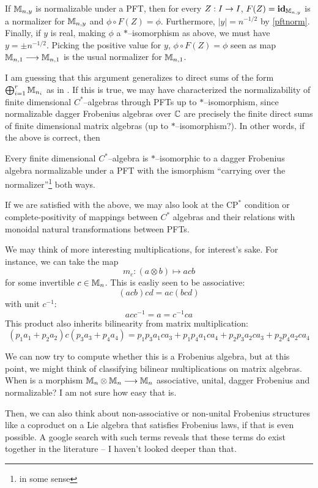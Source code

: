 If $\mathbb{M}_{n, y}$ is normalizable under a PFT, then for every $Z : I \rightarrow I$,
$F(Z) = \textbf{id}_{\mathbb{M}_{n, y}}$ is a normalizer for $\mathbb{M}_{n, y}$ and
$\phi \circ F(Z) = \phi$. Furthermore, $|y| = n^{-1/2}$ by \ref{pftnorm}.
Finally, if $y$ is real, making $\phi$ a $*$--isomorphism as above, we must have
$y = \pm n^{-1/2}$. Picking the positive value for $y$,
$\phi \circ F(Z) = \phi$ seen as map $\mathbb{M}_{n, 1} \longrightarrow \mathbb{M}_{n, 1}$ is the usual
normalizer for $\mathbb{M}_{n, 1}$.

I am guessing that this argument generalizes to direct sums of the form
$\bigoplus_{i = 1}^r \mathbb{M}_{n_i}$ as in \cite[10]{CatQChan}.  If this is true, we
may have characterized the normalizability of finite dimensional $C^*$--algebras
through PFTs up to $*$--isomorphism, since normalizable dagger Frobenius
algebras over $\mathbb{C}$ are precisely the finite direct sums of finite dimensional
matrix algebras (up to $*$--isomorphism?). In other words, if the above is
correct, then
\begin{thm}
Every finite dimensional $C^*$--algebra is $*$--isomorphic to a dagger Frobenius
algebra normalizable under a PFT with the ismorphism ``carrying over the
normalizer''\footnote{in some sense} both ways.
\end{thm}

If we are satisfied with the above, we may also look at the $\text{CP}^*$
condition or complete-positivity of mappings between $C^*$ algebras and their
relations with monoidal natural transformations between PFTs.

We may think of more interesting multiplications, for interest's sake. For
instance, we can take the map
\[
  m_c : (a \otimes b) \mapsto acb
\]
for some invertible $c \in \mathbb{M}_n$. This is easliy seen to be associative:
\[
  (acb)cd = ac(bcd)
\]
with unit $c^{-1}$:
\[
  acc^{-1} = a = c^{-1}ca
\]
This product also inherits bilinearity from matrix multiplication:
\[
  (p_1a_1 + p_2a_2)c(p_3a_3 + p_4a_4)
    = p_1p_3a_1ca_3 + p_1p_4a_1ca_4 + p_2p_3a_2ca_3 + p_2p_4a_2ca_4
\]

We can now try to compute whether this is a Frobenius algebra, but at this
point, we might think of classifying bilinear multiplications on matrix
algebras. When is a morphism $\mathbb{M}_n \otimes \mathbb{M}_n \longrightarrow \mathbb{M}_n$ associative, unital,
dagger Frobenius and normalizable? I am not sure how easy that is.

Then, we can also think about non-associative or non-unital Frobenius structures
like a coproduct on a Lie algebra that satisfies Frobenius laws, if that is even
possible. A google search with such terms reveals that these terms do exist
together in the literature -- I haven't looked deeper than that.

